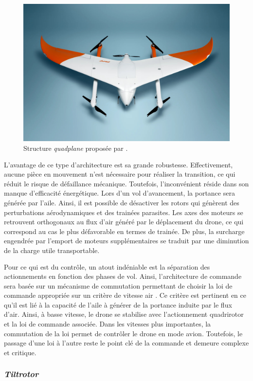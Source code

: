         \begin{figure}[ht!]
            \centering
                \includegraphics[width=0.6\columnwidth]{figures/Avy-Drone-quadplane.jpg}
                \caption{Structure \textit{quadplane} proposée par \cite{Avy_2023}.}
                \label{fig:quadplane}
        \end{figure}
        

        L'avantage de ce type d'architecture est sa grande robustesse. Effectivement, aucune pièce en mouvement n'est nécessaire pour réaliser la transition, ce qui réduit le risque de défaillance mécanique. Toutefois, l'inconvénient réside dans son manque d'efficacité énergétique. Lors d'un vol d'avancement, la portance sera générée par l'aile. Ainsi, il est possible de désactiver les rotors qui génèrent des perturbations aérodynamiques et des trainées parasites. Les axes des moteurs se retrouvent orthogonaux au flux d'air généré par le déplacement du drone, ce qui correspond au cas le plus défavorable en termes de trainée. De plus, la surcharge engendrée par l'emport de moteurs supplémentaires se traduit par une diminution de la charge utile transportable. 

        Pour ce qui est du contrôle, un atout indéniable est la séparation des actionnements en fonction des phases de vol. Ainsi, l'architecture de commande sera basée sur un mécanisme de commutation permettant de choisir la loi de commande appropriée sur un critère de vitesse air \cite{LiSongZhang2021, MathurAtkins2021, okulski2022small}. Ce critère est pertinent en ce qu'il est lié à la capacité de l'aile à générer de la portance induite par le flux d'air. Ainsi, à basse vitesse, le drone se stabilise avec l'actionnement quadrirotor et la loi de commande associée. Dans les vitesses plus importantes, la commutation de la loi permet de contrôler le drone en mode avion. Toutefois, le passage d'une loi à l'autre reste le point clé de la commande et demeure complexe et critique.

        \subsubsection*{\textit{Tiltrotor}}

